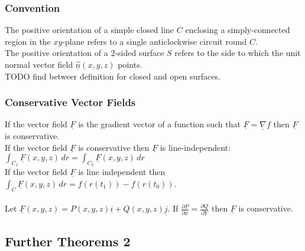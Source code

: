 \documentclass{article}
\begin{document}
			\subsubsection{Convention}
				The positive orientation of a simple closed line $C$ enclosing a simply-connected region in the $xy$-plane refers to a single anticlockwise circuit round $C$. \\
				The positive orientation of a 2-sided surface $S$ refers to the side to which the unit normal vector field $\underline{\hat{n}}(x,y,z)$ points. \\
				TODO find betweer definition for closed and open surfaces. \\
	
			\subsubsection{Conservative Vector Fields}
				If the vector field $\underline{F}$ is the gradient vector of a function such that $\underline{F}=\underline{\nabla}f$ then $\underline{F}$ is conservative. \\
				If the vector field $\underline{F}$ is conservative then $\underline{F}$ is line-independent: $\int_{C_1} \underline{F}(x,y,z) \,dr = \int_{C_2} \underline{F}(x,y,z) \,dr$ \\
				If the vector field $\underline{F}$ is line independent then $\int_C \underline{F}(x,y,z) \,dr = f(r(t_1)) - f(r(t_0))$. \\
				\\
				Let $\underline{F}(x,y,z) = P(x,y,z)\underline{i} + Q(x,y,z)\underline{j}$. If $\frac{\partial P}{\partial x} = \frac{\partial Q}{\partial Y}$ then $\underline{F}$ is conservative. \\
	
	
		\subsection{Further Theorems 2}
	
\end{document}
